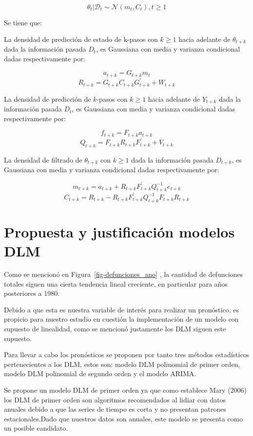 \documentclass[
  letterpaper,
  onepage,
  openany]{report}
\begin{document}
\[ \theta_{t} | \mathcal{D}_{t} \sim \mathcal{N}(m_{t}, C_{t}) , t \geq 1 \]

Se tiene que:

La densidad de predicción de estado de k-pasos con \(k \geq 1\) hacia
adelante de \(\theta_{t+k}\) dada la información pasada \(D_{t}\), es
Gaussiana con media y varianza condicional dadas respectivamente por:

\[  a_{t+k} = G_{t+k}m_{t} \]
\[ R_{t+k}= G_{t+k}C_{t+k}G^{'}_{t+k} + W_{t+k} \]

La densidad de predicción de \(k\)-pasos con \(k \geq 1\) hacia adelante
de \(Y_{t+k}\) dada la información pasada \(D_{t}\), es Gaussiana con
media y varianza condicional dadas respectivamente por:

\[  f_{t+k} = F_{t+k}a_{t+k} \]
\[ Q_{t+k}= F_{t+k}R_{t+k}F^{'}_{t+k} + V_{t+k} \]

La densidad de filtrado de \(\theta_{t+k}\) con \(k \geq 1\) dada la
información pasada \(D_{t+k}\), es Gaussiana con media y varianza
condicional dadas respectivamente por:

\[  m_{t+k} = a_{t+k} + R_{t+k}F^{'}_{t+k}Q^{-1}_{t+k}e_{t+k} \]
\[ C_{t+k}=R_{t+k} - R_{t+k}F^{'}_{t+k}Q^{-1}_{t+k}F_{t+k}R_{t+k}  \]

\hypertarget{propuesta-y-justificaciuxf3n-modelos-dlm}{%
\section{Propuesta y justificación modelos
DLM}\label{propuesta-y-justificaciuxf3n-modelos-dlm}}

Como se mencionó en Figura~\ref{fig-defunciones_ano} , la cantidad de
defunciones totales siguen una cierta tendencia lineal creciente, en
particular para años posteriores a 1980.

Debido a que esta es nuestra variable de interés para realizar un
pronóstico, es propicio para nuestro estudio en cuestión la
implementación de un modelo con supuesto de linealidad, como se mencionó
justamente los DLM siguen este supuesto.

Para llevar a cabo los pronósticos se proponen por tanto tres métodos
estadísticos pertenecientes a los DLM, estos son: modelo DLM polinomial
de primer orden, modelo DLM polinomial de segundo orden y el modelo
ARIMA.

Se propone un modelo DLM de primer orden ya que como establece Mary
(2006) los DLM de primer orden son algoritmos recomendados al lidiar con
datos anuales debido a que las series de tiempo es corta y no presentan
patrones estacionales.Dado que nuestros datos son anuales, este modelo
se presenta como un posible candidato.
\end{document}
